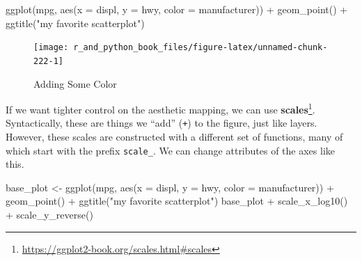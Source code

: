 \documentclass[
  12pt,
  krantz2]{krantz}
\makeatletter
\newenvironment{Shaded}{\begin{snugshade}}{\end{snugshade}}
\newcommand{\AttributeTok}[1]{\textcolor[rgb]{0.61,0.61,0.61}{#1}}
\newcommand{\FunctionTok}[1]{\textcolor[rgb]{0,0,0}{#1}}
\newcommand{\NormalTok}[1]{#1}
\newcommand{\OtherTok}[1]{\textcolor[rgb]{0.37,0.37,0.37}{#1}}
\newcommand{\SpecialCharTok}[1]{\textcolor[rgb]{0,0,0}{#1}}
\newcommand{\StringTok}[1]{\textcolor[rgb]{0.5,0.5,0.5}{#1}}
\renewcommand{\href}[2]{#2\footnote{\url{#1}}}
\newenvironment{kframe}{%
\medskip{}
\setlength{\fboxsep}{.8em}
 \def\at@end@of@kframe{}%
 \ifinner\ifhmode%
  \def\at@end@of@kframe{\end{minipage}}%
  \begin{minipage}{\columnwidth}%
 \fi\fi%
 \def\FrameCommand##1{\hskip\@totalleftmargin \hskip-\fboxsep
 \colorbox{shadecolor}{##1}\hskip-\fboxsep
     \hskip-\linewidth \hskip-\@totalleftmargin \hskip\columnwidth}%
 \MakeFramed {\advance\hsize-\width
   \@totalleftmargin\z@ \linewidth\hsize
   \@setminipage}}%
 {\par\unskip\endMakeFramed%
 \at@end@of@kframe}
\renewenvironment{Shaded}{\begin{kframe}}{\end{kframe}}
\makeatother
\begin{document}
\begin{Shaded}
\begin{Highlighting}[]
\FunctionTok{ggplot}\NormalTok{(mpg, }\FunctionTok{aes}\NormalTok{(}\AttributeTok{x =}\NormalTok{ displ, }\AttributeTok{y =}\NormalTok{ hwy, }\AttributeTok{color =}\NormalTok{ manufacturer))  }\SpecialCharTok{+}
  \FunctionTok{geom\_point}\NormalTok{() }\SpecialCharTok{+} 
  \FunctionTok{ggtitle}\NormalTok{(}\StringTok{"my favorite scatterplot"}\NormalTok{)}
\end{Highlighting}
\end{Shaded}

\begin{figure}

{\centering \texttt{[image: r\_and\_python\_book\_files/figure-latex/unnamed-chunk-222-1]} 

}

\caption{Adding Some Color}\label{fig:unnamed-chunk-222}
\end{figure}

If we want tighter control on the aesthetic mapping, we can use \href{https://ggplot2-book.org/scales.html\#scales}{\textbf{scales}}. Syntactically, these are things we ``add'' (\texttt{+}) to the figure, just like layers. However, these scales are constructed with a different set of functions, many of which start with the prefix \texttt{scale\_}. We can change attributes of the axes like this.

\begin{Shaded}
\begin{Highlighting}[]
\NormalTok{base\_plot }\OtherTok{\textless{}{-}} \FunctionTok{ggplot}\NormalTok{(mpg, }
                    \FunctionTok{aes}\NormalTok{(}\AttributeTok{x =}\NormalTok{ displ, }\AttributeTok{y =}\NormalTok{ hwy, }\AttributeTok{color =}\NormalTok{ manufacturer)) }\SpecialCharTok{+}
             \FunctionTok{geom\_point}\NormalTok{() }\SpecialCharTok{+} 
             \FunctionTok{ggtitle}\NormalTok{(}\StringTok{"my favorite scatterplot"}\NormalTok{)}
\NormalTok{base\_plot }\SpecialCharTok{+} \FunctionTok{scale\_x\_log10}\NormalTok{() }\SpecialCharTok{+} \FunctionTok{scale\_y\_reverse}\NormalTok{()}
\end{Highlighting}
\end{Shaded}
\end{document}
